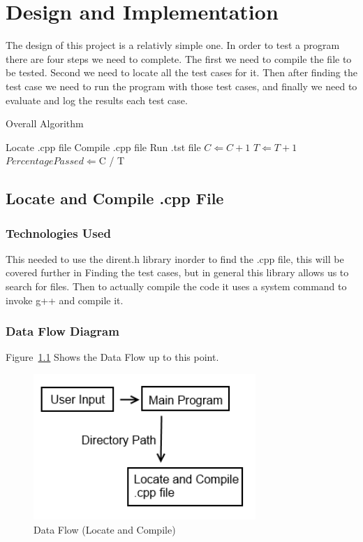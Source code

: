 \chapter{Design  and Implementation}
The design of this project is a relativly simple one.  In order to test a program there are four steps we need to complete.
The first we need to compile the file to be tested.  Second we need to locate all the test cases for it.  Then after finding the test case we need to run the program with those test cases, and finally we need to evaluate and log the results each test case.

\begin{algorithm} [tbh]              %
\caption{Overall Algorithm}
\label{algover}
\begin{algorithmic}
	\STATE Locate .cpp file
	\STATE Compile .cpp file
		\STATE Run .tst file
			\STATE $C \Leftarrow C + 1$
		\ENDIF
		\STATE $T \Leftarrow T + 1$
	\ENDWHILE
	\STATE $Percentage Passed \Leftarrow $C / T
\end{algorithmic}
\end{algorithm}
 

\section{Locate and Compile .cpp File}

\subsection{Technologies  Used}
This needed to use the dirent.h library inorder to find the .cpp file, this will be covered further in
Finding the test cases, but in general this library allows us to search for files.  Then to actually compile
the code it uses a system command to invoke g++ and compile it.

\subsection{Data Flow Diagram}
Figure~\ref{DataFlow1} Shows the Data Flow up to this point.

\begin{figure}[tbh]
\begin{center}
\includegraphics[width=0.75\textwidth]{./DataFlow1}
\end{center}
\caption{Data Flow (Locate and Compile) \label{DataFlow1}}
\end{figure}


